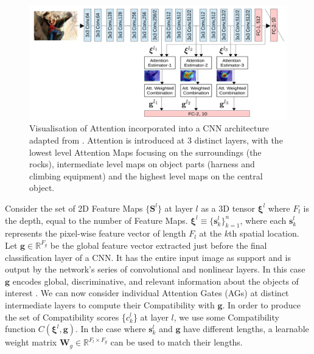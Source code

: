 \documentclass[11pt]{article}
\begin{document}
\begin{figure}[htp]
    \centering
    \includegraphics[width=17cm]{figures/cnnattention.png}
    \caption{Visualisation of Attention incorporated into a CNN architecture adapted from \cite{jetley}. Attention is introduced at 3 distinct layers, with the lowest level Attention Maps focusing on the surroundings (the rocks), intermediate level maps on object parts (harness and climbing equipment) and the highest level maps on the central object.}
 \end{figure}  

Consider the set of 2D Feature Maps $\{\bm{S}^l\}$ at layer $l$ as a 3D tensor $\bm{\xi}^{l}$ where $F_l$ is the depth, equal to the number of Feature Maps. $\bm{\xi}^{l} \equiv \{\bm{s}^{l}_{k}\}^{n}_{k=1}$, where each $\bm{s}^{l}_{k}$ represents the pixel-wise feature vector of length $F_l$ at the $k$th spatial location. Let $\bm{g} \in \mathbb{R}^{F_g}$ be the global feature vector extracted just before the final classification layer of a CNN. It has the entire input image as support and is output by the network’s series of convolutional and nonlinear layers. In this case $\bm{g}$ encodes global, discriminative, and relevant information about the objects of interest \cite{schlemper1}. We can now consider individual Attention Gates (AGs) at distinct intermediate layers to compute their Compatibility with $\bm{g}$. In order to produce the set of Compatibility scores \{${c^{l}_{k}}$\} at layer $l$, we use some Compatibility function $C(\bm{\xi}^{l}, \bm{g})$. In the case where $\bm{s}^{l}_{k}$ and $\bm{g}$ have different lengths, a learnable weight matrix $\bm{W}_g \in \mathbb{R}^{F_l \times F_g}$ can be used to match their lengths. \newline
\end{document}
